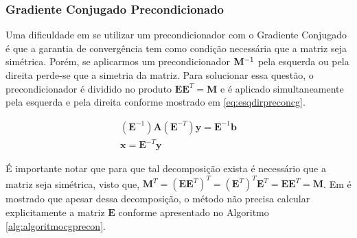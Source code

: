 \subsubsection{Gradiente Conjugado Precondicionado}

Uma dificuldade em se utilizar um precondicionador com o Gradiente Conjugado é que a garantia de convergência tem como condição necessária que a matriz seja simétrica. Porém, se aplicarmos um precondicionador $\mathbf{M}^{-1}$ pela esquerda ou pela direita perde-se que a simetria da matriz. Para solucionar essa questão, o precondicionador é dividido no produto $\mathbf{E}\mathbf{E}^T = \mathbf{M}$ e é aplicado simultaneamente pela esquerda e pela direita conforme mostrado em \eqref{eq:esqdirpreconcg}.


\begin{align} \label{eq:esqdirpreconcg}
(\mathbf{E}^{-1})\mathbf{A}(\mathbf{E}^{-T}) \mathbf{y} = \mathbf{E}^{-1}\mathbf{b} \\
\mathbf{x} = \mathbf{E}^{-T} \mathbf{y}
\end{align}


É importante notar que para que tal decomposição exista é necessário que a matriz seja simétrica, visto que, $\mathbf{M}^T = (\mathbf{E}\mathbf{E}^T)^T = (\mathbf{E}^T)^T \mathbf{E}^T = \mathbf{E}\mathbf{E}^T = \mathbf{M}$. Em \citet{Shewchuk94anintroduction} é mostrado que apesar  dessa decomposição, o método não precisa calcular explicitamente a matriz $\mathbf{E}$ conforme apresentado no Algoritmo \ref{alg:algoritmocgprecon}.


